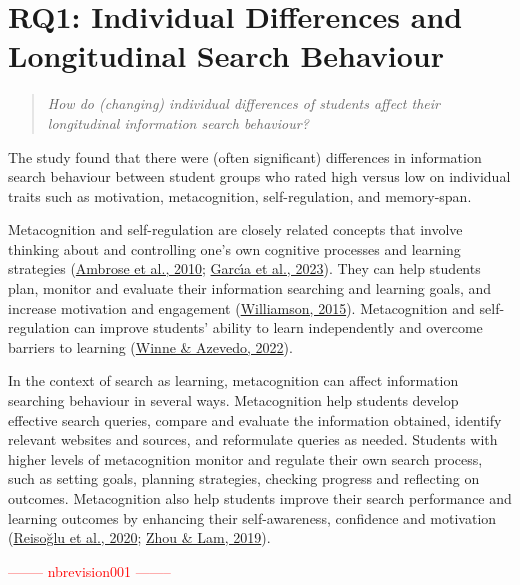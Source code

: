 \documentclass[letterpaper, nobind]{templates/ociamthesis}
\begin{document}
\hypertarget{rq1-individual-differences-and-longitudinal-search-behaviour}{%
\section{RQ1: Individual Differences and Longitudinal Search Behaviour}\label{rq1-individual-differences-and-longitudinal-search-behaviour}}

\begin{quote}
\emph{How do (changing) individual differences of students affect their longitudinal information search behaviour?}
\end{quote}

The study found that there were (often significant) differences in information search behaviour between student groups who rated high versus low on individual traits such as motivation, metacognition, self-regulation, and memory-span.

Metacognition and self-regulation are closely related concepts that involve thinking about and controlling one's own cognitive processes and learning strategies (\protect\hyperlink{ref-ambrose2010howa}{Ambrose et al., 2010}; \protect\hyperlink{ref-garcia2023motivational}{Garcı́a et al., 2023}).
They can help students plan, monitor and evaluate their information searching and learning goals, and increase motivation and engagement (\protect\hyperlink{ref-williamson2015selfregulated}{Williamson, 2015}).
Metacognition and self-regulation can improve students' ability to learn independently and overcome barriers to learning (\protect\hyperlink{ref-winne2022metacognition}{Winne \& Azevedo, 2022}).

In the context of search as learning, metacognition can affect information searching behaviour in several ways.
Metacognition help students develop effective search queries, compare and evaluate the information obtained, identify relevant websites and sources, and reformulate queries as needed.
Students with higher levels of metacognition monitor and regulate their own search process, such as setting goals, planning strategies, checking progress and reflecting on outcomes.
Metacognition also help students improve their search performance and learning outcomes by enhancing their self-awareness, confidence and motivation (\protect\hyperlink{ref-reisouglu2020analysis}{Reisoğlu et al., 2020}; \protect\hyperlink{ref-zhou2019metacognitive}{Zhou \& Lam, 2019}).

\textcolor{red}{-------- nbrevision001 --------}
\end{document}
